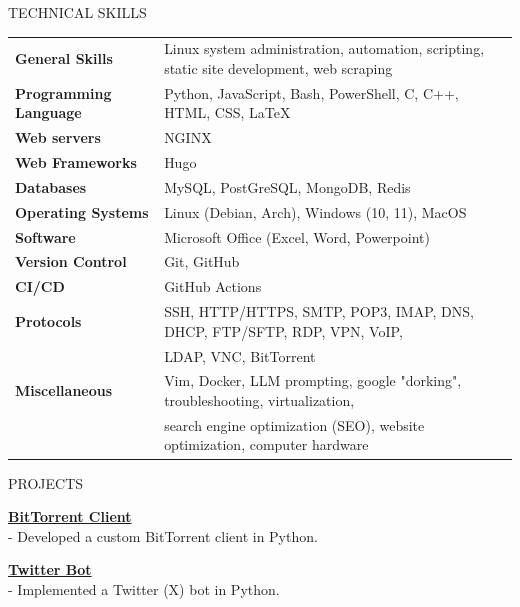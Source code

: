 \documentclass{résumé} %
\begin{document}
\begin{rSection}{TECHNICAL SKILLS}
\begin{tabular}{ @{} >{\bfseries}l @{\hspace{6ex}} l }
    General Skills & Linux system administration, automation, scripting, static site development, web scraping \\
    Programming Language & Python, JavaScript, Bash, PowerShell, C, C++, HTML, CSS, LaTeX \\
    Web servers & NGINX \\
    Web Frameworks & Hugo \\
    Databases & MySQL, PostGreSQL, MongoDB, Redis \\
    Operating Systems & Linux (Debian, Arch), Windows (10, 11), MacOS \\
    Software & Microsoft Office (Excel, Word, Powerpoint) \\
    Version Control & Git, GitHub \\
    CI/CD & GitHub Actions \\
    Protocols & SSH, HTTP/HTTPS, SMTP, POP3, IMAP, DNS, DHCP, FTP/SFTP, RDP, VPN, VoIP, \\ & LDAP, VNC, BitTorrent \\
    Miscellaneous & Vim, Docker, LLM prompting, google "dorking", troubleshooting, virtualization, \\ & search engine optimization (SEO), website optimization, computer hardware
\end{tabular}
\end{rSection}

\begin{rSection}{PROJECTS}
\vspace{-1.25em}
\item \textbf{\href{https://gutibran.com/bittorrent-client}{BitTorrent Client}} \\
- Developed a custom BitTorrent client in Python.
\item \textbf{\href{https://twitter.com/secplusdailybot}{Twitter Bot}} \\
- Implemented a Twitter (X) bot in Python.
\end{rSection} 
\end{document}

